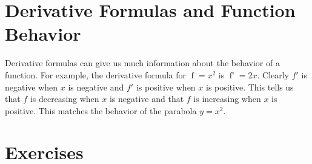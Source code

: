 \documentclass[12pt,]{book}
\theoremstyle{plain}
\theoremstyle{definition}
\numberwithin{equation}{section}
\newcommand{\fe}[2]{\mathop{{#1}{\left(#2\right)}}}
\newcommand{\fd}[1]{#1'}
\begin{document}
\section[Derivative Formulas and Function Behavior]{Derivative Formulas and Function Behavior}\label{section-derivative-formulas-and-function-behavior}
Derivative formulas can give us much information about the behavior of a function.  For example, the derivative formula for \(\fe{f}{x}=x^2\) is \(\fe{\fd{f}}{x}=2x\).  Clearly \(\fd{f}\) is negative when \(x\) is negative and \(\fd{f}\) is positive when \(x\) is positive.  This tells us that \(f\) is decreasing when \(x\) is negative and that \(f\) is increasing when \(x\) is positive.  This matches the behavior of the parabola \(y=x^2\).%
\typeout{************************************************}
\typeout{************************************************}
\section*{Exercises}\label{exercises-39}
\end{document}
